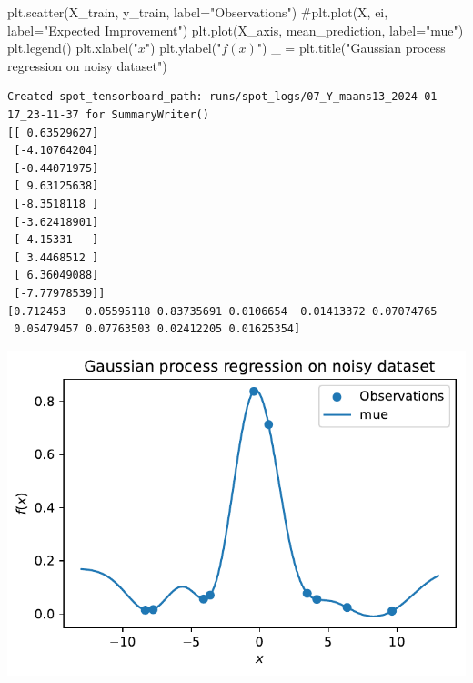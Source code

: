 \documentclass[
  letterpaper,
  DIV=11,
  numbers=noendperiod]{scrreprt}
\newenvironment{Shaded}{\begin{snugshade}}{\end{snugshade}}
\newcommand{\CommentTok}[1]{\textcolor[rgb]{0.37,0.37,0.37}{#1}}
\newcommand{\NormalTok}[1]{\textcolor[rgb]{0.00,0.23,0.31}{#1}}
\newcommand{\OperatorTok}[1]{\textcolor[rgb]{0.37,0.37,0.37}{#1}}
\newcommand{\StringTok}[1]{\textcolor[rgb]{0.13,0.47,0.30}{#1}}
\begin{document}
\begin{Shaded}
\begin{Highlighting}[]
\NormalTok{plt.scatter(X\_train, y\_train, label}\OperatorTok{=}\StringTok{"Observations"}\NormalTok{)}
\CommentTok{\#plt.plot(X, ei, label="Expected Improvement")}
\NormalTok{plt.plot(X\_axis, mean\_prediction, label}\OperatorTok{=}\StringTok{"mue"}\NormalTok{)}
\NormalTok{plt.legend()}
\NormalTok{plt.xlabel(}\StringTok{"$x$"}\NormalTok{)}
\NormalTok{plt.ylabel(}\StringTok{"$f(x)$"}\NormalTok{)}
\NormalTok{\_ }\OperatorTok{=}\NormalTok{ plt.title(}\StringTok{"Gaussian process regression on noisy dataset"}\NormalTok{)}
\end{Highlighting}
\end{Shaded}

\begin{verbatim}
Created spot_tensorboard_path: runs/spot_logs/07_Y_maans13_2024-01-17_23-11-37 for SummaryWriter()
[[ 0.63529627]
 [-4.10764204]
 [-0.44071975]
 [ 9.63125638]
 [-8.3518118 ]
 [-3.62418901]
 [ 4.15331   ]
 [ 3.4468512 ]
 [ 6.36049088]
 [-7.77978539]]
[0.712453   0.05595118 0.83735691 0.0106654  0.01413372 0.07074765
 0.05479457 0.07763503 0.02412205 0.01625354]
\end{verbatim}

\includegraphics{012_num_spot_ei_files/figure-pdf/cell-55-output-2.pdf}
\end{document}
